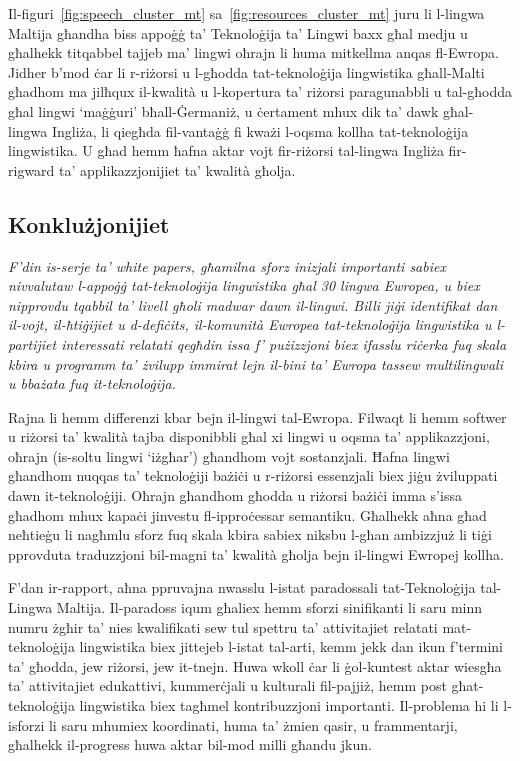 \begin{multicols}{2}
Il-figuri~\ref{fig:speech_cluster_mt} sa~\ref{fig:resources_cluster_mt} juru li l-lingwa Maltija għandha biss appoġġ ta’ Teknoloġija ta’ Lingwi baxx għal medju u għalhekk titqabbel tajjeb ma’ lingwi oħrajn li huma mitkellma anqas fl-Ewropa. Jidher b’mod ċar li r-riżorsi u l-għodda tat-teknoloġija lingwistika għall-Malti għadhom ma jilħqux il-kwalità u l-kopertura ta’ riżorsi paragunabbli u tal-għodda għal lingwi ‘maġġuri’ bħall-Ġermaniż, u ċertament mhux dik ta’ dawk għal-lingwa Ingliża, li qiegħda fil-vantaġġ fi kważi l-oqsma kollha tat-teknoloġija lingwistika. U għad hemm ħafna aktar vojt fir-riżorsi tal-lingwa Ingliża fir-rigward ta’ applikazzjonijiet ta’ kwalità għolja. 

\subsection{Konklużjonijiet}

\emph{F’din is-serje ta’ \emph{white papers}, għamilna sforz inizjali importanti sabiex nivvalutaw l-appoġġ tat-teknoloġija lingwistika għal 30 lingwa Ewropea, u biex nipprovdu tqabbil ta’ livell għoli madwar dawn il-lingwi. Billi jiġi identifikat dan il-vojt, il-ħtiġijiet u d-defiċits, il-komunità Ewropea tat-teknoloġija lingwistika u l-partijiet interessati relatati qegħdin issa f’ pużizzjoni biex ifasslu riċerka fuq skala kbira u programm ta’ żvilupp immirat lejn il-bini ta’ Ewropa tassew multilingwali u bbażata fuq it-teknoloġija.}

Rajna li hemm differenzi kbar bejn il-lingwi tal-Ewropa. Filwaqt li hemm softwer u riżorsi ta’ kwalità tajba disponibbli għal xi lingwi u oqsma ta’ applikazzjoni, oħrajn (is-soltu lingwi `iżgħar') għandhom vojt sostanzjali.  Ħafna lingwi għandhom nuqqas ta’ teknoloġiji bażiċi u r-riżorsi essenzjali biex jiġu żviluppati dawn it-teknoloġiji. Oħrajn għandhom għodda u riżorsi bażiċi imma s’issa għadhom mhux kapaċi jinvestu fl-ipproċessar semantiku. Għalhekk aħna għad neħtieġu li nagħmlu sforz fuq skala kbira sabiex niksbu l-għan ambizzjuż li tiġi pprovduta traduzzjoni bil-magni ta’ kwalità għolja bejn il-lingwi Ewropej kollha. 

F’dan ir-rapport, aħna ppruvajna nwasslu l-istat paradossali tat-Teknoloġija tal-Lingwa Maltija. Il-paradoss iqum għaliex hemm sforzi sinifikanti li saru minn numru żgħir ta’ nies kwalifikati sew  tul spettru ta’ attivitajiet relatati mat-teknoloġija lingwistika biex jittejeb l-istat tal-arti, kemm jekk dan ikun f’termini ta’ għodda, jew riżorsi, jew it-tnejn. Huwa wkoll ċar li ġol-kuntest aktar wiesgħa ta’ attivitajiet edukattivi, kummerċjali u kulturali fil-pajjiż, hemm post għat-teknoloġija lingwistika biex tagħmel kontribuzzjoni importanti. Il-problema hi li l-isforzi li saru mhumiex koordinati, huma ta’ żmien qasir, u frammentarji, għalhekk il-progress huwa aktar bil-mod milli għandu jkun. 


\end{multicols}
